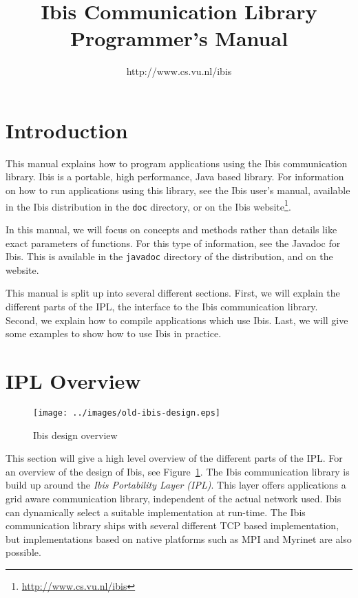 \documentclass[10pt]{article}
\begin{document}
\title{Ibis Communication Library Programmer's Manual}

\author{http://www.cs.vu.nl/ibis}

\maketitle

\section{Introduction}

This manual explains how to program applications using the Ibis
communication library. Ibis is a portable, high performance, Java based
library. For information on how to run applications using this library,
see the Ibis user's manual, available in the Ibis distribution in the
\texttt{doc} directory, or on the Ibis
website\footnote{\url{http://www.cs.vu.nl/ibis}}.

In this manual, we will focus on concepts and methods rather than
details like exact parameters of functions. For this type of
information, see the Javadoc for Ibis. This is available in the
\texttt{javadoc} directory of the distribution, and on the website.

This manual is split up into several different sections. First, we will
explain the different parts of the IPL, the interface to the Ibis
communication library. Second, we explain how to compile applications
which use Ibis. Last, we will give some examples 
to show how to use Ibis in practice.

\section{IPL Overview}


\begin{figure} \centering
\texttt{[image: ../images/old-ibis-design.eps]}
\caption{Ibis design overview} \label{design}
\end{figure}

This section will give a high level overview of the different parts of
the IPL.  For an overview of the design of Ibis, see
Figure~\ref{design}. The Ibis communication library is build up around
the \emph{Ibis Portability Layer (IPL)}. This layer offers applications a
grid aware communication library, independent of the actual network
used. Ibis can dynamically select a suitable implementation at run-time.
The Ibis communication library ships with several different TCP based
implementation, but implementations based on native platforms such as
MPI and Myrinet are also possible.
\end{document}
